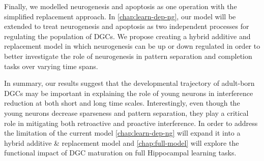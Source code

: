 Finally, we modelled neurogenesis and apoptosis as one operation with the simplified
replacement approach. 
In \cref{chap:learn-dep-ng}, our model will be extended to 
treat neurogenesis and apoptosis as two 
independent processes for regulating the population of \acp{DGC}. 
We propose creating a hybrid additive 
and replacement model in which neurogenesis can be up or down regulated in order to better 
investigate the role of neurogenesis in pattern separation and completion tasks over 
varying time spans. 

In summary, our results suggest that the developmental trajectory of adult-born 
\acp{DGC} may be important in explaining the role of young neurons 
in interference reduction at both short and long time scales. 
Interestingly, even though the young neurons decrease sparseness 
and pattern separation, they play a critical role in mitigating both retroactive and proactive interference. 
In order to address the limitation of the current model \cref{chap:learn-dep-ng} will expand it 
into a hybrid additive \& replacement model and \cref{chap:full-model} will explore the 
functional impact of \ac{DGC} maturation on full 
Hippocampal learning tasks.
